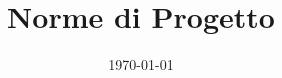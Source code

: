 \documentclass[openany,12pt,a4paper]{report}
\title{Norme di Progetto}
\author{}
\date{\today}
\begin{document}
	\printglossaries
\end{document}

